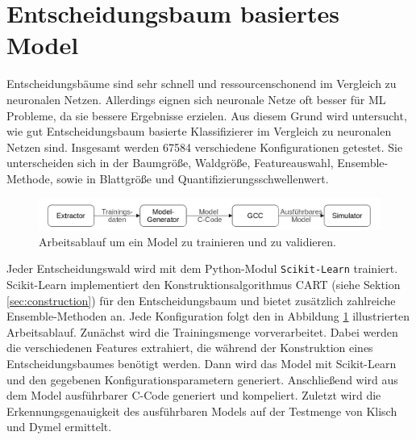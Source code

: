 \section{Entscheidungsbaum basiertes Model}
Entscheidungsbäume sind sehr schnell und ressourcenschonend im Vergleich zu neuronalen Netzen. Allerdings eignen sich neuronale Netze oft besser für ML Probleme, da sie bessere Ergebnisse
erzielen. Aus diesem Grund wird untersucht, wie gut Entscheidungsbaum basierte Klassifizierer im Vergleich zu neuronalen Netzen sind. Insgesamt werden 67584 verschiedene Konfigurationen getestet.
Sie unterscheiden sich in der Baumgröße, Waldgröße, Featureauswahl, Ensemble-Methode, sowie in Blattgröße und Quantifizierungsschwellenwert.
\newline
\begin{figure}
    \centering
    \includegraphics[width=\linewidth]{images/model_workflow.jpg}
    \caption{Arbeitsablauf um ein Model zu trainieren und zu validieren.}
    \label{fig:model_workflow}
\end{figure}
\newline
Jeder Entscheidungswald wird mit dem Python-Modul \texttt{Scikit-Learn} trainiert. Scikit-Learn implementiert den Konstruktionsalgorithmus CART (siehe Sektion \ref{sec:construction}) für den Entscheidungsbaum und bietet
zusätzlich zahlreiche Ensemble-Methoden an. Jede Konfiguration folgt den in Abbildung \ref{fig:model_workflow} illustrierten Arbeitsablauf.
\newline
\newline
Zunächst wird die Trainingsmenge vorverarbeitet. Dabei werden die verschiedenen
Features extrahiert, die während der Konstruktion eines Entscheidungsbaumes benötigt werden. Dann wird das Model mit Scikit-Learn und den gegebenen Konfigurationsparametern generiert. Anschließend wird aus dem Model
ausführbarer C-Code generiert und kompeliert. Zuletzt wird die Erkennungsgenauigkeit des ausführbaren Models auf der Testmenge von Klisch und Dymel ermittelt.

